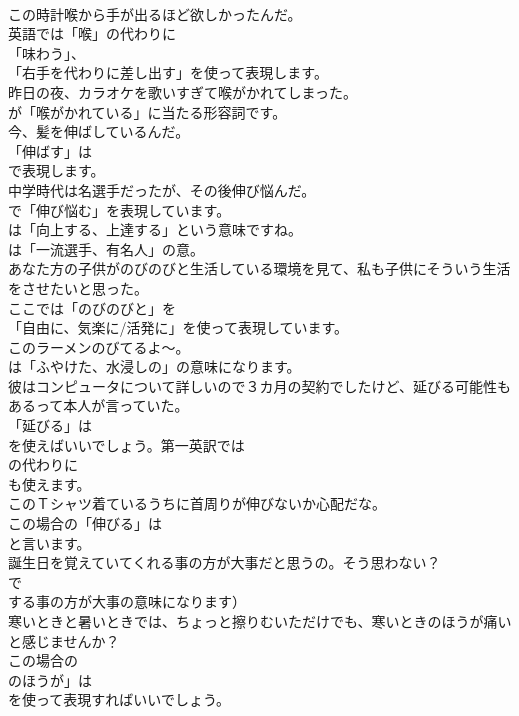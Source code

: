 \documentclass[8pt]{extreport}
\begin{document}
\begin{CJK}{UTF8}{min}
\\	この時計喉から手が出るほど欲しかったんだ。 
\\	英語では「喉」の代わりに
\\	「味わう」、
\\	「右手を代わりに差し出す」を使って表現します。	
\\	昨日の夜、カラオケを歌いすぎて喉がかれてしまった。 
\\	が「喉がかれている」に当たる形容詞です。	
\\	今、髪を伸ばしているんだ。 
\\	「伸ばす」は 
\\	で表現します。	
\\	中学時代は名選手だったが、その後伸び悩んだ。 
\\	で「伸び悩む」を表現しています。
\\	は「向上する、上達する」という意味ですね。
\\	は「一流選手、有名人」の意。	
\\	あなた方の子供がのびのびと生活している環境を見て、私も子供にそういう生活をさせたいと思った。 
\\	ここでは「のびのびと」を
\\	「自由に、気楽に/活発に」を使って表現しています。	
\\	このラーメンのびてるよ～。 
\\	は「ふやけた、水浸しの」の意味になります。	
\\	彼はコンピュータについて詳しいので３カ月の契約でしたけど、延びる可能性もあるって本人が言っていた。 
\\	「延びる」は 
\\	を使えばいいでしょう。第一英訳では 
\\	の代わりに 
\\	も使えます。	
\\	このＴシャツ着ているうちに首周りが伸びないか心配だな。 
\\	この場合の「伸びる」は
\\	と言います。	
\\	誕生日を覚えていてくれる事の方が大事だと思うの。そう思わない？ 
\\	で
\\	する事の方が大事の意味になります）	
\\	寒いときと暑いときでは、ちょっと擦りむいただけでも、寒いときのほうが痛いと感じませんか？ 
\\	この場合の
\\	のほうが」は 
\\	を使って表現すればいいでしょう。

\end{CJK}
\end{document}
